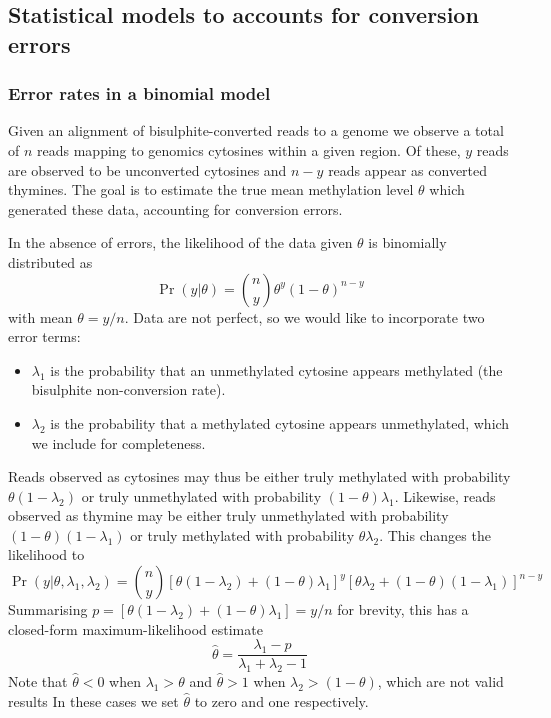 \documentclass[12pt,longbibliography]{article}
\begin{document}
\subsection{Statistical models to accounts for conversion errors}

\subsubsection{Error rates in a binomial model} \label{sec:binomial-with-errors}

Given an alignment of bisulphite-converted reads to a genome we observe a total of $n$ reads mapping to genomics cytosines within a given region. Of these, $y$ reads are observed to be unconverted cytosines and $n-y$ reads appear as converted thymines. The goal is to estimate the true mean methylation level $\theta$ which generated these data, accounting for conversion errors.

In the absence of errors, the likelihood of the data given $\theta$ is binomially distributed as
\begin{equation}
    \label{eqn:classic-binomial}
    \Pr(y| \theta) = {n \choose y} \theta^y(1-\theta)^{n-y}
\end{equation}
with mean $\theta=y/n$.
Data are not perfect, so we would like to incorporate two error terms:
\begin{itemize}
    \item $\lambda_1$ is the probability that an unmethylated cytosine appears methylated (the bisulphite non-conversion rate).
    \item $\lambda_2$ is the probability that a methylated cytosine appears unmethylated, which we include for completeness.
\end{itemize}
Reads observed as cytosines may thus be either truly methylated with probability $\theta(1-\lambda_2)$ or truly unmethylated with probability $(1-\theta)\lambda_1$. Likewise, reads observed as thymine may be either truly unmethylated with probability $(1-\theta)(1-\lambda_1)$ or truly methylated with probability $\theta \lambda_2$.
This changes the likelihood to
\begin{equation}
    \label{eqn:binom-with-errors}
    \Pr(y | \theta, \lambda_1, \lambda_2) = 
    {n \choose y}
    [\theta(1-\lambda_2) + (1-\theta)\lambda_1]^y
    [\theta \lambda_2 + (1-\theta)(1-\lambda_1)]^{n-y}
\end{equation}
Summarising $p=[\theta(1-\lambda_2) + (1-\theta)\lambda_1] = y/n$ for brevity, this has a closed-form maximum-likelihood estimate
\begin{equation}
    \label{eqn:ml-theta}
    \hat{\theta} = \frac{\lambda_1-p}{\lambda_1 + \lambda_2 -1}
\end{equation}
Note that $\hat{\theta}<0$ when $\lambda_1 > \theta$ and $\hat{\theta}>1$ when $\lambda_2 > (1-\theta)$, which are not valid results
In these cases we set $\hat{\theta}$ to zero and one respectively.
\end{document}
